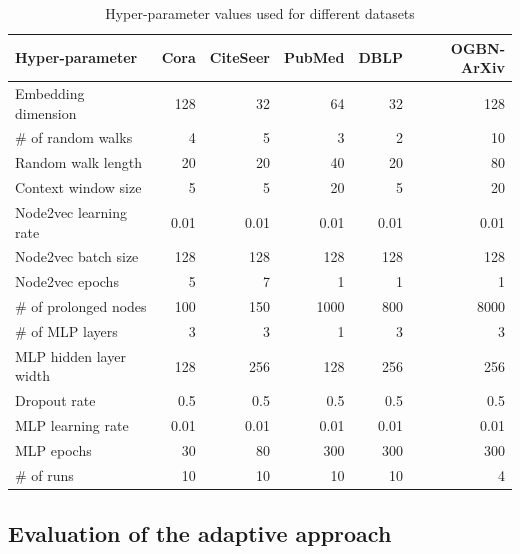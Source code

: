 \begin{table}
  \caption{Hyper-parameter values used for different datasets}
  \label{tab:hyperparameter-values}
  \begin{tabular}{lrrrrr}
    \toprule
    Hyper-parameter        & Cora & CiteSeer & PubMed & DBLP & OGBN-ArXiv \\
    \midrule
    Embedding dimension    & 128  & 32       & 64     & 32   & 128        \\
    \# of random walks     & 4    & 5        & 3      & 2    & 10         \\
    Random walk length     & 20   & 20       & 40     & 20   & 80         \\
    Context window size    & 5    & 5        & 20     & 5    & 20         \\
    Node2vec learning rate & 0.01 & 0.01     & 0.01   & 0.01 & 0.01       \\
    Node2vec batch size    & 128  & 128      & 128    & 128  & 128        \\
    Node2vec epochs        & 5    & 7        & 1      & 1    & 1          \\
    \# of prolonged nodes  & 100  & 150      & 1000   & 800  & 8000       \\
    \# of MLP layers       & 3    & 3        & 1      & 3    & 3          \\
    MLP hidden layer width & 128  & 256      & 128    & 256  & 256        \\
    Dropout rate           & 0.5  & 0.5      & 0.5    & 0.5  & 0.5        \\
    MLP learning rate      & 0.01 & 0.01     & 0.01   & 0.01 & 0.01       \\
    MLP epochs             & 30   & 80       & 300    & 300  & 300        \\
    \# of runs             & 10   & 10       & 10     & 10   & 4          \\
    \bottomrule
  \end{tabular}
\end{table}

\subsection{Evaluation of the adaptive approach}


